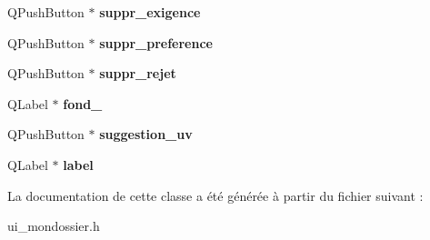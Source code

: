 \begin{DoxyCompactItemize}
\item 
\hypertarget{class_ui__mondossier_a9646776bf491dffcb936d8b5909af695}{Q\+Push\+Button $\ast$ {\bfseries suppr\+\_\+exigence}}\label{class_ui__mondossier_a9646776bf491dffcb936d8b5909af695}

\item 
\hypertarget{class_ui__mondossier_ae6357c71d6b93abf264298fa79309a15}{Q\+Push\+Button $\ast$ {\bfseries suppr\+\_\+preference}}\label{class_ui__mondossier_ae6357c71d6b93abf264298fa79309a15}

\item 
\hypertarget{class_ui__mondossier_a698c2d3ec121ece0161f242701b97a5a}{Q\+Push\+Button $\ast$ {\bfseries suppr\+\_\+rejet}}\label{class_ui__mondossier_a698c2d3ec121ece0161f242701b97a5a}

\item 
\hypertarget{class_ui__mondossier_a5dc5440eb9874075a4796d5d97ee5f43}{Q\+Label $\ast$ {\bfseries fond\+\_}}\label{class_ui__mondossier_a5dc5440eb9874075a4796d5d97ee5f43}

\item 
\hypertarget{class_ui__mondossier_a452a7091d72ee139c8c5e70ba32299ce}{Q\+Push\+Button $\ast$ {\bfseries suggestion\+\_\+uv}}\label{class_ui__mondossier_a452a7091d72ee139c8c5e70ba32299ce}

\item 
\hypertarget{class_ui__mondossier_a9f58e528e4e62cbd5d3d0b5e7b79177d}{Q\+Label $\ast$ {\bfseries label}}\label{class_ui__mondossier_a9f58e528e4e62cbd5d3d0b5e7b79177d}

\end{DoxyCompactItemize}


La documentation de cette classe a été générée à partir du fichier suivant \+:\begin{DoxyCompactItemize}
\item 
ui\+\_\+mondossier.\+h\end{DoxyCompactItemize}

